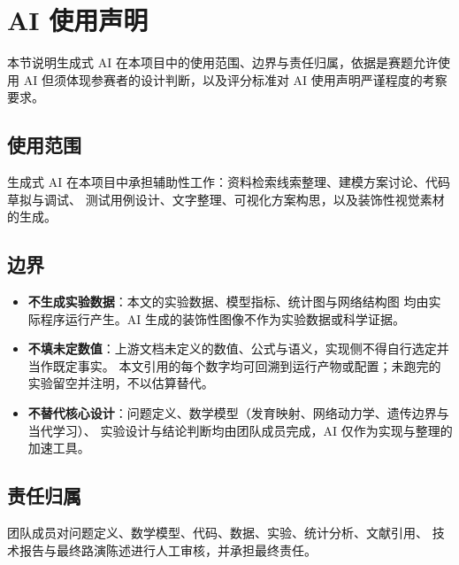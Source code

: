 \section{AI 使用声明}\label{sec:ai-decl}

本节说明生成式 AI 在本项目中的使用范围、边界与责任归属，依据是赛题允许使用 AI
但须体现参赛者的设计判断，以及评分标准对 AI 使用声明严谨程度的考察要求。

\subsection{使用范围}

生成式 AI 在本项目中承担辅助性工作：资料检索线索整理、建模方案讨论、代码草拟与调试、
测试用例设计、文字整理、可视化方案构思，以及装饰性视觉素材的生成。

\subsection{边界}

\begin{itemize}
  \item \textbf{不生成实验数据}：本文的实验数据、模型指标、统计图与网络结构图
        均由实际程序运行产生。AI 生成的装饰性图像不作为实验数据或科学证据。
  \item \textbf{不填未定数值}：上游文档未定义的数值、公式与语义，实现侧不得自行选定并当作既定事实。
        本文引用的每个数字均可回溯到运行产物或配置；未跑完的实验留空并注明，不以估算替代。
  \item \textbf{不替代核心设计}：问题定义、数学模型（发育映射、网络动力学、遗传边界与当代学习）、
        实验设计与结论判断均由团队成员完成，AI 仅作为实现与整理的加速工具。
\end{itemize}

\subsection{责任归属}

团队成员对问题定义、数学模型、代码、数据、实验、统计分析、文献引用、
技术报告与最终路演陈述进行人工审核，并承担最终责任。
